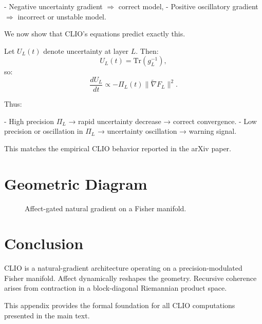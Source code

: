 \documentclass[12pt,oneside]{book}
\theoremstyle{plain}
\theoremstyle{definition}
\begin{document}
- Negative uncertainty gradient $\Rightarrow$ correct model,
- Positive oscillatory gradient $\Rightarrow$ incorrect or unstable model.

We now show that CLIO’s equations predict exactly this.

Let $U_L(t)$ denote uncertainty at layer $L$.
Then:
\[
U_L(t) = \mathrm{Tr}(g_L^{-1}),
\]
so:
\[
\frac{dU_L}{dt}
\propto
- \Pi_L(t)
\|\widetilde{\nabla} F_L\|^2.
\]

Thus:

- High precision $\Pi_L$ → rapid uncertainty decrease → correct convergence.
- Low precision or oscillation in $\Pi_L$ → uncertainty oscillation → warning signal.

This matches the empirical CLIO behavior reported in the arXiv paper.

\section{Geometric Diagram}

\begin{figure}[h]
\centering
{}
\caption{Affect-gated natural gradient on a Fisher manifold.}
\end{figure}

\section{Conclusion}

CLIO is a natural-gradient architecture operating on a
precision-modulated Fisher manifold.
Affect dynamically reshapes the geometry.
Recursive coherence arises from contraction in a block-diagonal
Riemannian product space.

This appendix provides the formal foundation for all CLIO computations
presented in the main text.
\end{document}
